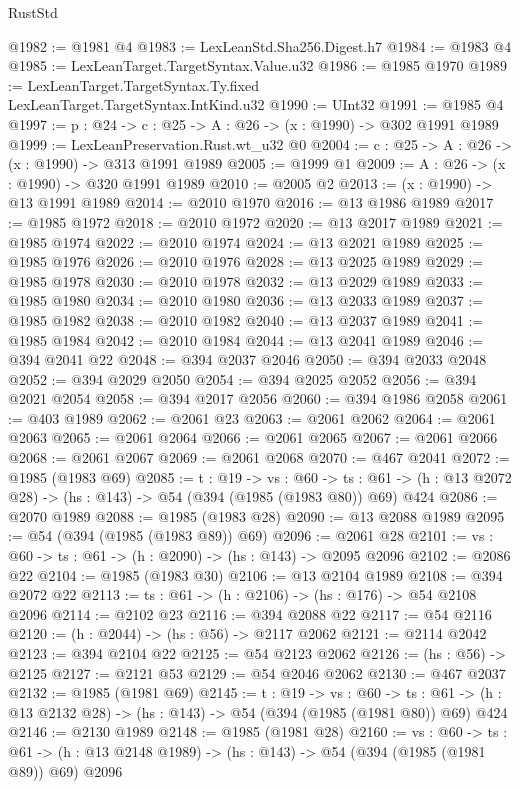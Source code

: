 \begin{lexlean}{RustStd}
\begin{coremodule}
{\begin{coremodule}
{{{{{{{{@1982 := @1981 @4
@1983 := LexLeanStd.Sha256.Digest.h7
@1984 := @1983 @4
@1985 := LexLeanTarget.TargetSyntax.Value.u32
@1986 := @1985 @1970
@1989 := LexLeanTarget.TargetSyntax.Ty.fixed LexLeanTarget.TargetSyntax.IntKind.u32
@1990 := UInt32
@1991 := @1985 @4
@1997 := {p : @24} -> {c : @25} -> {A : @26} -> (x : @1990) -> @302 @1991 @1989
@1999 := LexLeanPreservation.Rust.wt_u32 @0
@2004 := {c : @25} -> {A : @26} -> (x : @1990) -> @313 @1991 @1989
@2005 := @1999 @1
@2009 := {A : @26} -> (x : @1990) -> @320 @1991 @1989
@2010 := @2005 @2
@2013 := (x : @1990) -> @13 @1991 @1989
@2014 := @2010 @1970
@2016 := @13 @1986 @1989
@2017 := @1985 @1972
@2018 := @2010 @1972
@2020 := @13 @2017 @1989
@2021 := @1985 @1974
@2022 := @2010 @1974
@2024 := @13 @2021 @1989
@2025 := @1985 @1976
@2026 := @2010 @1976
@2028 := @13 @2025 @1989
@2029 := @1985 @1978
@2030 := @2010 @1978
@2032 := @13 @2029 @1989
@2033 := @1985 @1980
@2034 := @2010 @1980
@2036 := @13 @2033 @1989
@2037 := @1985 @1982
@2038 := @2010 @1982
@2040 := @13 @2037 @1989
@2041 := @1985 @1984
@2042 := @2010 @1984
@2044 := @13 @2041 @1989
@2046 := @394 @2041 @22
@2048 := @394 @2037 @2046
@2050 := @394 @2033 @2048
@2052 := @394 @2029 @2050
@2054 := @394 @2025 @2052
@2056 := @394 @2021 @2054
@2058 := @394 @2017 @2056
@2060 := @394 @1986 @2058
@2061 := @403 @1989
@2062 := @2061 @23
@2063 := @2061 @2062
@2064 := @2061 @2063
@2065 := @2061 @2064
@2066 := @2061 @2065
@2067 := @2061 @2066
@2068 := @2061 @2067
@2069 := @2061 @2068
@2070 := @467 @2041
@2072 := @1985 (@1983 @69)
@2085 := {t : @19} ->
  {vs : @60} ->
  {ts : @61} -> (h : @13 @2072 @28) -> (hs : @143) -> @54 (@394 (@1985 (@1983 @80)) @69) @424
@2086 := @2070 @1989
@2088 := @1985 (@1983 @28)
@2090 := @13 @2088 @1989
@2095 := @54 (@394 (@1985 (@1983 @89)) @69)
@2096 := @2061 @28
@2101 := {vs : @60} -> {ts : @61} -> (h : @2090) -> (hs : @143) -> @2095 @2096
@2102 := @2086 @22
@2104 := @1985 (@1983 @30)
@2106 := @13 @2104 @1989
@2108 := @394 @2072 @22
@2113 := {ts : @61} -> (h : @2106) -> (hs : @176) -> @54 @2108 @2096
@2114 := @2102 @23
@2116 := @394 @2088 @22
@2117 := @54 @2116
@2120 := (h : @2044) -> (hs : @56) -> @2117 @2062
@2121 := @2114 @2042
@2123 := @394 @2104 @22
@2125 := @54 @2123 @2062
@2126 := (hs : @56) -> @2125
@2127 := @2121 @53
@2129 := @54 @2046 @2062
@2130 := @467 @2037
@2132 := @1985 (@1981 @69)
@2145 := {t : @19} ->
  {vs : @60} ->
  {ts : @61} -> (h : @13 @2132 @28) -> (hs : @143) -> @54 (@394 (@1985 (@1981 @80)) @69) @424
@2146 := @2130 @1989
@2148 := @1985 (@1981 @28)
@2160 := {vs : @60} ->
  {ts : @61} -> (h : @13 @2148 @1989) -> (hs : @143) -> @54 (@394 (@1985 (@1981 @89)) @69) @2096
}}}}}}}}
\end{coremodule}}
\end{coremodule}
\end{lexlean}

